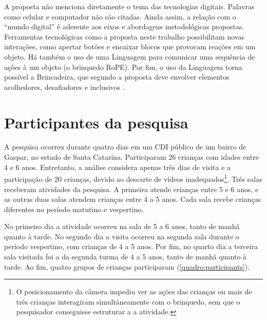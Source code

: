 A proposta não menciona diretamente o tema das tecnologias digitais. Palavras como celular e computador não são citadas. Ainda assim, a relação com o “mundo digital” é aderente aos eixos e abordagens metodológicas propostas. Ferramentas tecnológicas como a proposta neste trabalho possibilitam novas interações, como apertar botões e encaixar blocos que provocam reações em um objeto. Há também o uso de uma Linguagem para comunicar uma sequência de ações à um objeto (o brinquedo RoPE). Por fim, o uso da Linguagem torna possível a Brincadeira, que segundo a proposta deve envolver elementos acolhedores, desafiadores e inclusivos \cite[p.50]{gaspar_proposta_2010}. 


\section{Participantes da pesquisa}
\label{sec:participantes}

A pesquisa ocorreu durante quatro dias em um CDI público de um bairro de Gaspar, no estado de Santa Catarina. Participaram 26 crianças com idades entre 4 e 6 anos. Entretanto, a análise considera apenas três dias de visita e a participação de 20 crianças, devido ao descarte de vídeos inadequados\footnote{O posicionamento da câmera impediu ver as ações das crianças ou mais de três crianças interagiram simultâneamente com o brinquedo, sem que o pesquisador conseguisse estruturar a a atividade.}. Três salas receberam atividades da pesquisa. A primeira atende crianças entre 5 e 6 anos, e as outras duas salas atendem crianças entre 4 a 5 anos. Cada sala recebe crianças diferentes no período matutino e vespertino.

No primeiro dia a atividade ocorreu na sala de 5 a 6 anos, tanto de manhã quanto à tarde. No segundo dia a visita ocorreu na segunda sala durante o período vespertino, com crianças de 4 a 5 anos. Por fim, no quarto dia a terceira sala visitada foi a da segunda turma de 4 a 5 anos, tanto de manhã quanto à tarde. Ao fim, quatro grupos de crianças participaram (\autoref{quadro:participants}).

